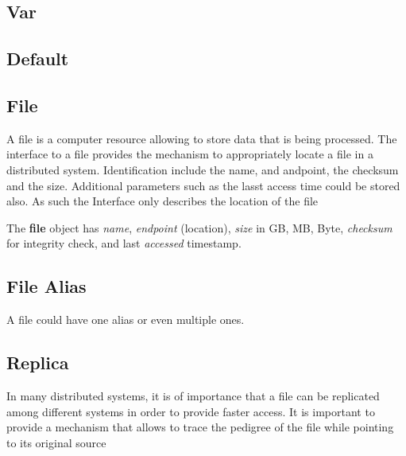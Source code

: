 \documentclass[9pt,twocolumn,twoside]{styles/osajnl}
\begin{document}
\subsection{Var}


\subsection{Default}


\subsection{File}

A file is a computer resource allowing to store data that is being
processed. The interface to a file provides the mechanism to
appropriately locate a file in a distributed system. Identification
include the name, and andpoint, the checksum and the size. Additional
parameters such as the lasst access time could be stored also. As such
the Interface only describes the location of the file 

The \textbf{file} object has \textit{name}, \textit{endpoint} (location), \textit{size}
in GB, MB, Byte, \textit{checksum} for integrity check, and last
\textit{accessed} timestamp. 


\subsection{File Alias}

A file could have one alias or even multiple ones.


\subsection{Replica}

In many distributed systems, it is of importance that a file can be
replicated among different systems in order to provide faster
access. It is important to provide a mechanism that allows to trace
the pedigree of the file while pointing to its original source 

\end{document}
